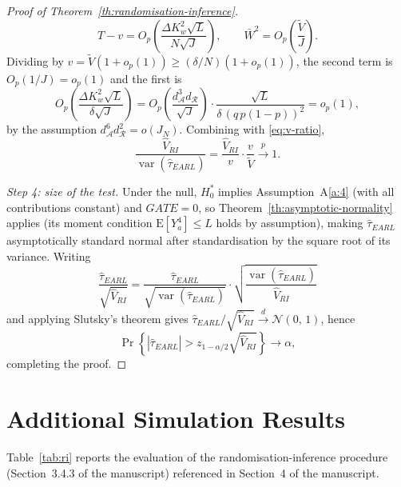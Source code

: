 \documentclass[sigconf,nonacm]{acmart}
\newcounter{assumption}
\newcommand{\E}{\mathrm E}
\DeclareMathOperator{\var}{var}
\begin{document}
\begin{proof}[Proof of Theorem~\ref{th:randomisation-inference}]
\begin{equation*}
        T - v = O_p\left(\frac{\Delta K_w^2\sqrt L}{N\sqrt J}\right),\qquad
        \bar W^2 = O_p\left(\frac{\tilde V}{J}\right).
    \end{equation*}
    Dividing by $v = \tilde V(1+o_p(1)) \ge (\delta/N)(1+o_p(1))$, the second term is $O_p(1/J) = o_p(1)$ and the first is
    \begin{equation*}
        O_p\left(\frac{\Delta K_w^2\sqrt L }{\delta\sqrt J}\right) = O_p\left(\frac{d^3_{\mathcal A}d_{\mathcal R}}{\sqrt{J}}\right)\cdot\frac{\sqrt L}{\delta\,(q\,p(1-p))^2} = o_p(1),
    \end{equation*}
    by the assumption $d^6_{\mathcal A}d^2_{\mathcal R} = o(J_N)$. Combining with \eqref{eq:v-ratio},
    \begin{equation*}
        \frac{\hat V_{RI}}{\var(\hat\tau^{\phantom{1}}_{EARL})} = \frac{\hat V_{RI}}{v}\cdot\frac{v}{\tilde V}\stackrel{p}{\to}1.
    \end{equation*}

    \emph{Step 4: size of the test.} Under the null, $H_0^*$ implies Assumption~A\ref{a:4} (with all contributions constant) and $GATE=0$, so Theorem~\ref{th:asymptotic-normality} applies (its moment condition $\E[Y_a^4]\le L$ holds by assumption), making $\hat\tau_{EARL}$ asymptotically standard normal after standardisation by the square root of its variance. Writing
    \begin{equation*}
        \frac{\hat\tau^{\phantom{1}}_{EARL}}{\sqrt{\hat V_{RI}}} = \frac{\hat\tau^{\phantom{1}}_{EARL}}{\sqrt{\var\left(\hat\tau^{\phantom{1}}_{EARL}\right)}} \cdot \sqrt{\frac{\var\left(\hat\tau^{\phantom{1}}_{EARL}\right)}{\hat V_{RI}}}
    \end{equation*}
    and applying Slutsky's theorem gives $\hat\tau_{EARL}/\sqrt{\hat V_{RI}}\stackrel{d}{\to}\mathcal N(0,\,1)$, hence
    \begin{equation*}
        \Pr\left\{\left|\hat\tau^{\phantom{1}}_{EARL}\right| > z_{1-\alpha/2}\sqrt{\hat V_{RI}}\right\}\to \alpha,
    \end{equation*}
    completing the proof.
\end{proof}


\section{Additional Simulation Results}

Table~\ref{tab:ri} reports the evaluation of the randomisation-inference procedure (Section~3.4.3 of the manuscript) referenced in Section~4 of the manuscript.
\end{document}
